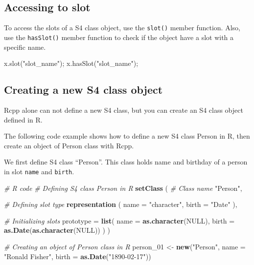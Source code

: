 \documentclass[]{book}
\newenvironment{Shaded}{\begin{snugshade}}{\end{snugshade}}
\newcommand{\KeywordTok}[1]{\textcolor[rgb]{0.13,0.29,0.53}{\textbf{#1}}}
\newcommand{\DataTypeTok}[1]{\textcolor[rgb]{0.13,0.29,0.53}{#1}}
\newcommand{\DecValTok}[1]{\textcolor[rgb]{0.00,0.00,0.81}{#1}}
\newcommand{\StringTok}[1]{\textcolor[rgb]{0.31,0.60,0.02}{#1}}
\newcommand{\CommentTok}[1]{\textcolor[rgb]{0.56,0.35,0.01}{\textit{#1}}}
\newcommand{\OtherTok}[1]{\textcolor[rgb]{0.56,0.35,0.01}{#1}}
\newcommand{\NormalTok}[1]{#1}
\theoremstyle{definition}
\theoremstyle{definition}
\theoremstyle{remark}
\begin{document}
\subsection{Accessing to slot}\label{accessing-to-slot}

To access the slots of a S4 class object, use the \texttt{slot()} member
function. Also, use the \texttt{hasSlot()} member function to check if
the object have a slot with a specific name.

\begin{Shaded}
\begin{Highlighting}[]
\NormalTok{x.slot(}\StringTok{"slot_name"}\NormalTok{);}
\NormalTok{x.hasSlot(}\StringTok{"slot_name"}\NormalTok{);}
\end{Highlighting}
\end{Shaded}

\subsection{Creating a new S4 class
object}\label{creating-a-new-s4-class-object}

Rcpp alone can not define a new S4 class, but you can create an S4 class
object defined in R.

The following code example shows how to define a new S4 class Person in
R, then create an object of Person class with Rcpp.

We first define S4 class ``Person''. This class holds name and birthday
of a person in slot \texttt{name} and \texttt{birth}.

\begin{Shaded}
\begin{Highlighting}[]
\CommentTok{# R code}
\CommentTok{# Defining S4 class Person in R}
\KeywordTok{setClass}\NormalTok{ (}
  \CommentTok{# Class name}
  \StringTok{"Person"}\NormalTok{,}

  \CommentTok{# Defining slot type}
  \KeywordTok{representation}\NormalTok{ (}
    \DataTypeTok{name =} \StringTok{"character"}\NormalTok{,}
    \DataTypeTok{birth =} \StringTok{"Date"}
\NormalTok{  ),}

  \CommentTok{# Initializing slots}
  \DataTypeTok{prototype =} \KeywordTok{list}\NormalTok{(}
    \DataTypeTok{name =} \KeywordTok{as.character}\NormalTok{(}\OtherTok{NULL}\NormalTok{),}
    \DataTypeTok{birth =} \KeywordTok{as.Date}\NormalTok{(}\KeywordTok{as.character}\NormalTok{(}\OtherTok{NULL}\NormalTok{))}
\NormalTok{  )}
\NormalTok{)}

\CommentTok{# Creating an object of Person class in R}
\NormalTok{person_}\DecValTok{01}\NormalTok{ <-}\StringTok{ }\KeywordTok{new}\NormalTok{(}\StringTok{"Person"}\NormalTok{,}
                 \DataTypeTok{name =} \StringTok{"Ronald Fisher"}\NormalTok{,}
                 \DataTypeTok{birth =} \KeywordTok{as.Date}\NormalTok{(}\StringTok{"1890-02-17"}\NormalTok{))}
\end{Highlighting}
\end{Shaded}
\end{document}
